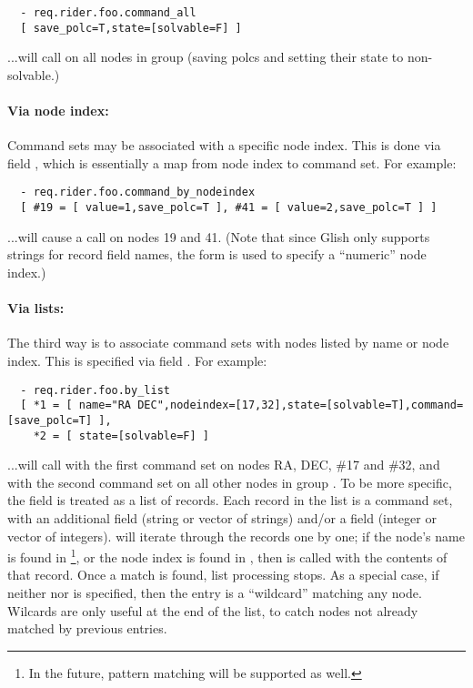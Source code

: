 \begin{verbatim}
  - req.rider.foo.command_all
  [ save_polc=T,state=[solvable=F] ]  
\end{verbatim}

  ...will call  on all nodes in group  (saving
  polcs and setting their state to non-solvable.)

  \paragraph{Via node index:} Command sets may be associated with a specific
  node index. This is done via field , which is
  essentially a map from node index to command set. For example:

\begin{verbatim}
  - req.rider.foo.command_by_nodeindex
  [ #19 = [ value=1,save_polc=T ], #41 = [ value=2,save_polc=T ] ]
\end{verbatim}

  ...will cause a  call on nodes 19 and 41. (Note that
  since Glish only supports strings for record field names, the 
  form is used to specify a ``numeric'' node index.)

  \paragraph{Via lists:} The third way is to associate command sets with nodes
  listed by name or node index. This is specified via field
  . For example:

\begin{verbatim}
  - req.rider.foo.by_list
  [ *1 = [ name="RA DEC",nodeindex=[17,32],state=[solvable=T],command=[save_polc=T] ],
    *2 = [ state=[solvable=F] ]
\end{verbatim}

  ...will call  with the first command set on nodes RA,
  DEC, \#17 and \#32, and with the second command set on all other nodes in
  group . To be more specific, the  field is
  treated as a list  of records. Each record in the list is a command set, with
  an additional  field (string or vector of strings) and/or a
   field (integer or vector of integers). 
  will iterate through the records one by one; if the node's name is found in
  \footnote{In the future, pattern matching will be supported as
  well.}, or the node index is found in , then
   is called with the contents of that record. Once a
  match is found, list processing stops. As a special case, if neither
   nor  is specified, then the entry is a ``wildcard''
  matching any node. Wilcards are only useful at the end of the list, to catch
  nodes not already matched by previous entries.
  

